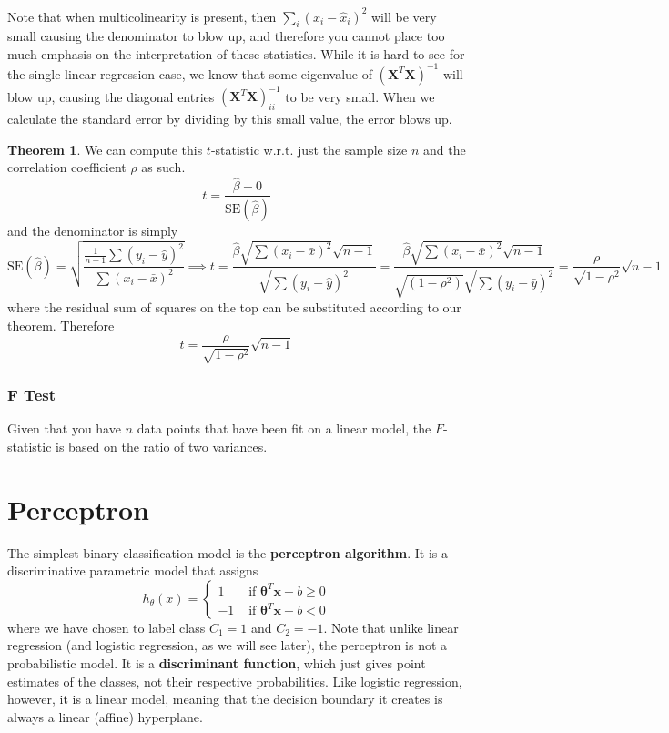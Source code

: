 \documentclass{article}
\theoremstyle{definition}
\newtheorem{theorem}{Theorem}[section]
\theoremstyle{remark}
\theoremstyle{definition}
\begin{document}
Note that when multicolinearity is present, then $\sum_{i} (x_i - \hat{x}_i)^2$ will be very small causing the denominator to blow up, and therefore you cannot place too much emphasis on the interpretation of these statistics. While it is hard to see for the single linear regression case, we know that some eigenvalue of $(\mathbf{X}^T \mathbf{X})^{-1}$ will blow up, causing the diagonal entries $(\mathbf{X}^T \mathbf{X})^{-1}_{ii}$ to be very small. When we calculate the standard error by dividing by this small value, the error blows up. 

\begin{theorem}
We can compute this $t$-statistic w.r.t. just the sample size $n$ and the correlation coefficient $\rho$ as such. 
\[t = \frac{\hat{\beta} - 0}{\mathrm{SE}(\hat{\beta})}\]
and the denominator is simply 
\[\mathrm{SE}(\hat{\beta}) = \sqrt{\frac{\frac{1}{n-1} \sum (y_i - \hat{y})^2}{\sum (x_i - \bar{x})^2}} \implies t = \frac{\hat{\beta} \sqrt{\sum (x_i - \bar{x})^2} \sqrt{n-1}}{\sqrt{\sum (y_i - \hat{y})^2}} = \frac{\hat{\beta} \sqrt{\sum (x_i - \bar{x})^2} \sqrt{n-1}}{\sqrt{(1 - \rho^2)} \sqrt{\sum (y_i - \bar{y})^2}} = \frac{\rho}{\sqrt{1 - \rho^2}} \sqrt{n-1}\]
where the residual sum of squares on the top can be substituted according to our theorem. Therefore 
\[t = \frac{\rho}{\sqrt{1 - \rho^2}} \sqrt{n-1}\]
\end{theorem}


\subsubsection{F Test}

Given that you have $n$ data points that have been fit on a linear model, the $F$-statistic is based on the ratio of two variances. 

\section{Perceptron}

The simplest binary classification model is the \textbf{perceptron algorithm}. It is a discriminative parametric model that assigns 
\[h_\theta (x) = \begin{cases} 1 & \text{ if } \boldsymbol{\theta}^T \mathbf{x} + b \geq 0 \\ -1 & \text { if } \boldsymbol{\theta}^T \mathbf{x} + b < 0 \end{cases}\]
where we have chosen to label class $C_1 = 1$ and $C_2 = -1$. Note that unlike linear regression (and logistic regression, as we will see later), the perceptron is not a probabilistic model. It is a \textbf{discriminant function}, which just gives point estimates of the classes, not their respective probabilities. Like logistic regression, however, it is a linear model, meaning that the decision boundary it creates is always a linear (affine) hyperplane. 
\end{document}
